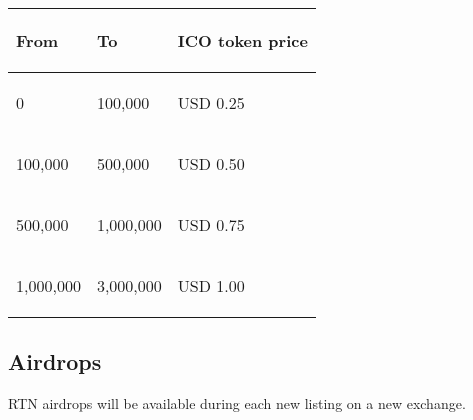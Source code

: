 \documentclass[
	article,			%
	12pt,				%
	oneside,			%
	a4paper,			%
	brazil,				%
	english,
	sumario=tradicional
	]{abntex2}
\begin{document}
\begin{table}[!h]
        \centering
        
\begin{tabular}{p{}p{}|p{}}
\begin{center}
\textbf{From}
\end{center}
 & \begin{center}
\textbf{To}
\end{center}
 & \begin{center}
\textbf{ICO token price}
\end{center}
 \\
\hline 
 \begin{center}
{\small 0}
\end{center}
 & \begin{center}
{\small 100,000}
\end{center}
 & \begin{center}
{\small USD 0.25}
\end{center}
 \\
\hline 
 \begin{center}
{\small 100,000}
\end{center}
 & \begin{center}
{\small 500,000}
\end{center}
 & \begin{center}
{\small USD 0.50}
\end{center}
 \\
\hline 
 \begin{center}
{\small 500,000}
\end{center}
 & \begin{center}
{\small 1,000,000}
\end{center}
 & \begin{center}
{\small USD 0.75}
\end{center}
 \\
\hline 
 \begin{center}
{\small 1,000,000}
\end{center}
 & \begin{center}
{\small 3,000,000}
\end{center}
 & \begin{center}
{\small USD 1.00}
\end{center}
 \\

\end{tabular}
        \end{table}


\subsection{Airdrops}
RTN airdrops will be available during each new listing on a new exchange.
\end{document}
